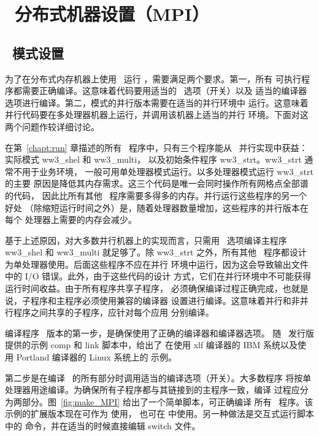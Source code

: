 \pagestyle{myheadings} \setcounter{page}{1} \setcounter{footnote}{0}

\section{~分布式机器设置（MPI）} \label{app:mpi}
\newcounters
\vssub
\subsection{~模式设置}
\vssub

为了在分布式内存机器上使用 \mpi\ 运行 \ws，需要满足两个要求。第一，所有
可执行程序都需要正确编译。这意味着代码要用适当的 \ws\ 选项（开关）以及
适当的编译器选项进行编译。第二，模式的并行版本需要在适当的并行环境中
运行。这意味着并行代码要在多处理器机器上运行，并调用该机器上适当的并行
环境。下面对这两个问题作较详细讨论。

在第~\ref{chapt:run} 章描述的所有 \ws\ 程序中，只有三个程序能从
\mpi\ 并行实现中获益：实际模式 {\file ww3\_shel} 和 {\file ww3\_multi}，
以及初始条件程序 {\file ww3\_strt}。{\file ww3\_strt} 通常不用于业务环境，
一般可用单处理器模式运行。以多处理器模式运行 {\file ww3\_strt} 的主要
原因是降低其内存需求。这三个代码是唯一会同时操作所有网格点全部谱的代码，
因此比所有其他 \ws\ 程序需要多得多的内存。并行运行这些程序的另一个好处
（除缩短运行时间之外）是，随着处理器数量增加，这些程序的并行版本在每个
处理器上需要的内存会减少。

基于上述原因，对大多数并行机器上的实现而言，只需用 \mpi\ 选项编译主程序
{\file ww3\_shel} 和 {\file ww3\_multi} 就足够了。除 {\file ww3\_strt}
之外，所有其他 \ws\ 程序都设计为单处理器使用。后面这些程序不应在并行
环境中运行，因为这会导致输出文件中的 I/O 错误。此外，由于这些代码的设计
方式，它们在并行环境中不可能获得运行时间收益。由于所有程序共享子程序，
必须确保编译过程正确完成，也就是说，子程序和主程序必须使用兼容的编译器
设置进行编译。这意味着并行和非并行程序之间共享的子程序，应针对每个应用
分别编译。

编译程序 \mpi\ 版本的第一步，是确保使用了正确的编译器和编译器选项。
随 \ws\ 发行版提供的示例 {\file comp} 和 {\file link} 脚本中，给出了
在使用 xlf 编译器的 IBM 系统以及使用 Portland 编译器的 Linux 系统上的
示例。

第二步是在编译 \ws\ 的所有部分时调用适当的编译选项（开关）。大多数程序
将按单处理器用途编译。为确保所有子程序都与其链接到的主程序一致，编译
过程应分为两部分。图~\ref{fig:make_MPI} 给出了一个简单脚本，可正确编译
所有 \ws\ 程序。该示例的扩展版本现在可作为  使用，
也可在  中使用。另一种做法是交互式运行脚本中的
命令，并在适当的时候直接编辑 {\file switch} 文件。

